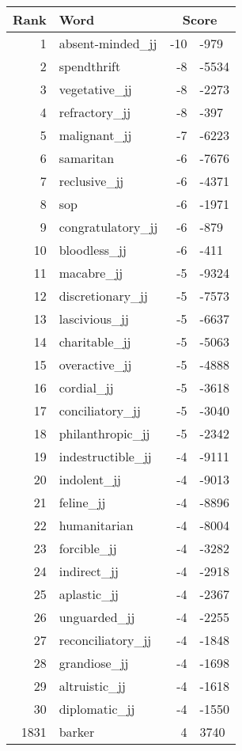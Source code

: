 \begin{longtable}[!htbp]{| rlr@{.}l |}
    \hline
    \textbf{Rank} & \textbf{Word} & \multicolumn{2}{c|}{\textbf{Score}} \\
    \hline
    \endhead
    1 & absent-minded\_jj & -10 & -979 \\
    2 & spendthrift & -8 & -5534 \\
    3 & vegetative\_jj & -8 & -2273 \\
    4 & refractory\_jj & -8 & -397 \\
    5 & malignant\_jj & -7 & -6223 \\
    6 & samaritan & -6 & -7676 \\
    7 & reclusive\_jj & -6 & -4371 \\
    8 & sop & -6 & -1971 \\
    9 & congratulatory\_jj & -6 & -879 \\
    10 & bloodless\_jj & -6 & -411 \\
    11 & macabre\_jj & -5 & -9324 \\
    12 & discretionary\_jj & -5 & -7573 \\
    13 & lascivious\_jj & -5 & -6637 \\
    14 & charitable\_jj & -5 & -5063 \\
    15 & overactive\_jj & -5 & -4888 \\
    16 & cordial\_jj & -5 & -3618 \\
    17 & conciliatory\_jj & -5 & -3040 \\
    18 & philanthropic\_jj & -5 & -2342 \\
    19 & indestructible\_jj & -4 & -9111 \\
    20 & indolent\_jj & -4 & -9013 \\
    21 & feline\_jj & -4 & -8896 \\
    22 & humanitarian & -4 & -8004 \\
    23 & forcible\_jj & -4 & -3282 \\
    24 & indirect\_jj & -4 & -2918 \\
    25 & aplastic\_jj & -4 & -2367 \\
    26 & unguarded\_jj & -4 & -2255 \\
    27 & reconciliatory\_jj & -4 & -1848 \\
    28 & grandiose\_jj & -4 & -1698 \\
    29 & altruistic\_jj & -4 & -1618 \\
    30 & diplomatic\_jj & -4 & -1550 \\
    1831 & barker & 4 & 3740 \\

\end{longtable}
